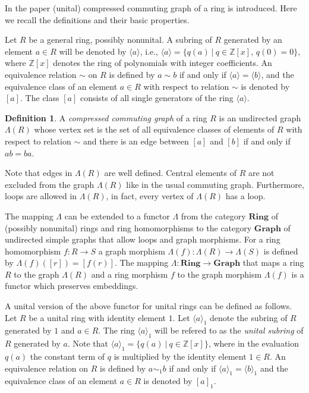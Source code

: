 \documentclass[12pt,a4paper]{amsart}
\theoremstyle{definition}
\newtheorem{definition}[proposition]{Definition}
\newcommand{\Z}{\mathbb{Z}}
\newcommand{\rng}[1]{\langle #1 \rangle}
\begin{document}
In the paper \cite{BoDoKoSt23} (unital) compressed commuting graph of a ring is introduced. Here we recall the definitions and their basic properties. 

Let $R$ be a general ring, possibly nonunital. A subring of $R$ generated by an element $a \in R$ will be denoted by $\rng{a}$, i.e., $\rng{a}=\{q(a) ~|~ q \in \Z[x],\, q(0)=0\}$, where $\Z[x]$ denotes the ring of polynomials with integer coefficients.
An equivalence relation $\sim$ on $R$ is defined by $a \sim b$ if and only if $\rng{a}=\rng{b}$, and the equivalence class of an element $a \in R$ with respect to relation $\sim$ is denoted by $[a]$.
The class $[a]$ consists of all single generators of the ring $\rng{a}$.

\begin{definition}\label{def:CCG}
A \emph{compressed commuting graph} of a ring $R$ is an undirected graph $\Lambda(R)$ whose vertex set is the set of all equivalence classes of elements of $R$ with respect to relation $\sim$ and there is an edge between $[a]$ and $[b]$ if and only if $ab=ba$.
\end{definition}

Note that edges in $\Lambda(R)$ are well defined. Central elements of $R$ are not excluded from the graph $\Lambda(R)$ like in the usual commuting graph. Furthermore, loops are allowed in $\Lambda(R)$, in fact, every vertex of $\Lambda(R)$ has a loop.

The mapping $\Lambda$ can be extended to a functor $\Lambda$ from the category $\mathbf{Ring}$ of (possibly nonunital) rings and ring  homomorphisms to the category $\mathbf{Graph}$ of undirected simple graphs that allow loops and graph morphisms. 
For a ring homomorphism $f \colon R \to S$ a graph morphism $\Lambda(f) \colon \Lambda(R) \to \Lambda(S)$ is defined by $\Lambda(f)([r])=[f(r)]$.
The mapping $\Lambda \colon \mathbf{Ring} \to \mathbf{Graph}$ that maps a ring $R$ to the graph $\Lambda(R)$ and a ring morphism $f$ to the graph morphism $\Lambda(f)$ is a functor which preserves embeddings.

A unital version of the above functor for unital rings can be defined as follows.
Let $R$ be a unital ring with identity element $1$.
Let $\rng{a}_1$ denote the subring of $R$ generated by $1$ and $a \in R$. The ring $\rng{a}_1$ will be refered to as the \emph{unital subring} of $R$ generated by $a$.
Note that $\rng{a}_1=\{q(a) ~|~ q \in \Z[x]\}$, where in the evaluation $q(a)$ the constant term of $q$ is multiplied by the identity element $1 \in R$.
An equivalence relation on $R$ is defined by $a \sim_1 b$ if and only if $\rng{a}_1=\rng{b}_1$ and the equivalence class of an element $a \in R$ is denoted by $[a]_1$.
\end{document}
